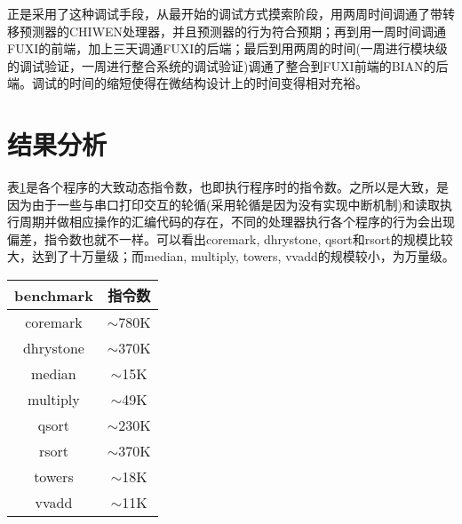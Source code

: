 正是采用了这种调试手段，从最开始的调试方式摸索阶段，用两周时间调通了带转移预测器的CHIWEN处理器，并且预测器的行为符合预期；再到用一周时间调通FUXI的前端，加上三天调通FUXI的后端；最后到用两周的时间(一周进行模块级的调试验证，一周进行整合系统的调试验证)调通了整合到FUXI前端的BIAN的后端。调试的时间的缩短使得在微结构设计上的时间变得相对充裕。

\section{结果分析}
表\ref{tab:inst_number}是各个程序的大致动态指令数，也即执行程序时的指令数。之所以是大致，是因为由于一些与串口打印交互的轮循(采用轮循是因为没有实现中断机制)和读取执行周期并做相应操作的汇编代码的存在，不同的处理器执行各个程序的行为会出现偏差，指令数也就不一样。可以看出coremark, dhrystone, qsort和rsort的规模比较大，达到了十万量级；而median, multiply, towers, vvadd的规模较小，为万量级。
\begin{table}[!htbp]
	\label{tab:inst_number}
	\centering
	\footnotesize%
	\setlength{\tabcolsep}{4pt}%
	\renewcommand{\arraystretch}{1.2}%
	\begin{tabular}{cc}
		\hline
		benchmark & 指令数 \\%
		\hline
		coremark    & $ \sim $780K\\
		dhrystone   & $ \sim $370K\\
		median 		& $ \sim $15K\\
		multiply 	& $ \sim $49K\\
		qsort  		& $ \sim $230K\\
		rsort  		& $ \sim $370K\\
		towers 		& $ \sim $18K\\
		vvadd 		& $ \sim $11K\\
		\hline
	\end{tabular}
\end{table}

